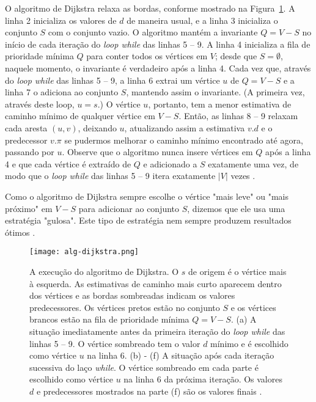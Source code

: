O algoritmo de Dijkstra relaxa as bordas, conforme mostrado na Figura~\ref{sec3:alg-dijkstra}. A linha 2 inicializa os valores de $d$ de maneira usual, e a linha 3 inicializa o conjunto $S$ com o conjunto vazio. O algoritmo mantém a invariante $Q = V - S$ no início de cada iteração do \emph{loop while} das linhas 5 – 9. A linha 4 inicializa a fila de prioridade mínima $Q$ para conter todos os vértices em $V$; desde que $S = \emptyset$, naquele momento, o invariante é verdadeiro após a linha 4. Cada vez que, através do \emph{loop while} das linhas 5 – 9, a linha 6 extrai um vértice $u$ de $Q = V - S$ e a linha 7 o adiciona ao conjunto $S$, mantendo assim o invariante. (A primeira vez, através deste loop, $u = s$.) O vértice $u$, portanto, tem a menor estimativa de caminho mínimo de qualquer vértice em $V - S$. Então, as linhas 8 – 9 relaxam cada aresta $(u, v)$, deixando $u$, atualizando assim a estimativa $v.d$ e o predecessor $v.\pi$ se pudermos melhorar o caminho mínimo encontrado até agora, passando por $u$. Observe que o algoritmo nunca insere vértices em $Q$ após a linha 4 e que cada vértice é extraído de $Q$ e adicionado a $S$ exatamente uma vez, de modo que o \emph{loop while} das linhas 5 – 9 itera exatamente $\left\lvert V\right\rvert$ vezes \cite{cormen2009}.

Como o algoritmo de Dijkstra sempre escolhe o vértice "mais leve" ou "mais próximo" em $V - S$ para adicionar ao conjunto $S$, dizemos que ele usa uma estratégia "gulosa". Este tipo de estratégia nem sempre produzem resultados ótimos \cite{cormen2009}.

\begin{figure}[!htb]
    \centering
    \texttt{[image: alg-dijkstra.png]}
    \caption{A execução do algoritmo de Dijkstra. O $s$ de origem é o vértice mais à esquerda. As estimativas de caminho mais curto aparecem dentro dos vértices e as bordas sombreadas indicam os valores predecessores. Os vértices pretos estão no conjunto $S$ e os vértices brancos estão na fila de prioridade mínima $Q = V - S$. (a) A situação imediatamente antes da primeira iteração do \emph{loop while} das linhas 5 – 9. O vértice sombreado tem o valor $d$ mínimo e é escolhido como vértice $u$ na linha 6. (b) - (f) A situação após cada iteração sucessiva do laço \emph{while}. O vértice sombreado em cada parte é escolhido como vértice $u$ na linha 6 da próxima iteração. Os valores $d$ e predecessores mostrados na parte (f) são os valores finais \cite{cormen2009}.}
    \label{sec3:alg-dijkstra}
\end{figure}

